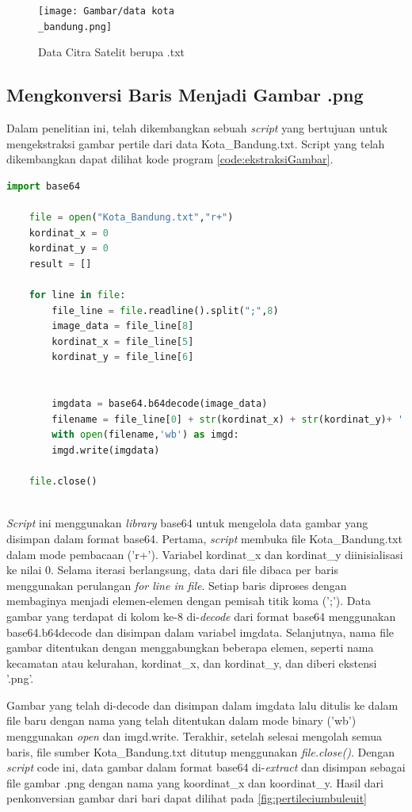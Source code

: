 \begin{figure}[H]
	\centering
	\texttt{[image: Gambar/data kota\\\_bandung.png]}
	\caption{Data Citra Satelit berupa .txt}
	\label{fig:kotabandungteks}
\end{figure} 

\subsection{Mengkonversi Baris Menjadi Gambar .png}
\label{subsec:pengkorvesianBaris}
Dalam penelitian ini, telah dikembangkan sebuah \textit{script} yang bertujuan untuk mengekstraksi gambar pertile dari data Kota\_Bandung.txt. Script yang telah dikembangkan dapat dilihat kode program \ref{code:ekstraksiGambar}.

\begin{lstlisting}[language=Python, caption=Script Mengekstrasi gambar per tile,label={code:ekstraksiGambar}]
	import base64
	
	file = open("Kota_Bandung.txt","r+")
	kordinat_x = 0
	kordinat_y = 0
	result = []
	
	for line in file:
		file_line = file.readline().split(";",8)   
		image_data = file_line[8]
		kordinat_x = file_line[5]
		kordinat_y = file_line[6]
		
		
		imgdata = base64.b64decode(image_data)
		filename = file_line[0] + str(kordinat_x) + str(kordinat_y)+ '.png'
		with open(filename,'wb') as imgd:
		imgd.write(imgdata)
	
	file.close()
		
\end{lstlisting}

\textit{Script }ini menggunakan \textit{library} base64 untuk mengelola data gambar yang disimpan dalam format base64. Pertama, \textit{script} membuka file Kota\_Bandung.txt dalam mode pembacaan ('r+'). Variabel kordinat\_x dan kordinat\_y diinisialisasi ke nilai 0. Selama iterasi berlangsung, data dari file dibaca per baris menggunakan perulangan \textit{for line in file}. Setiap baris diproses dengan membaginya menjadi elemen-elemen dengan pemisah titik koma (';'). Data gambar yang terdapat di kolom ke-8 di-\textit{decode} dari format base64 menggunakan base64.b64decode dan disimpan dalam variabel imgdata. Selanjutnya, nama file gambar ditentukan dengan menggabungkan beberapa elemen, seperti nama kecamatan atau kelurahan, kordinat\_x, dan kordinat\_y, dan diberi ekstensi '.png'.

Gambar yang telah di-decode dan disimpan dalam imgdata lalu ditulis ke dalam file baru dengan nama yang telah ditentukan dalam mode binary ('wb') menggunakan \textit{open} dan imgd.write. Terakhir, setelah selesai mengolah semua baris, file sumber Kota\_Bandung.txt ditutup menggunakan \textit{file.close()}. Dengan \textit{script} code ini, data gambar dalam format base64 di-\textit{extract} dan disimpan sebagai file gambar .png dengan nama yang koordinat\_x dan koordinat\_y. Hasil dari penkonversian gambar dari bari dapat dilihat pada \ref{fig:pertileciumbuleuit}

